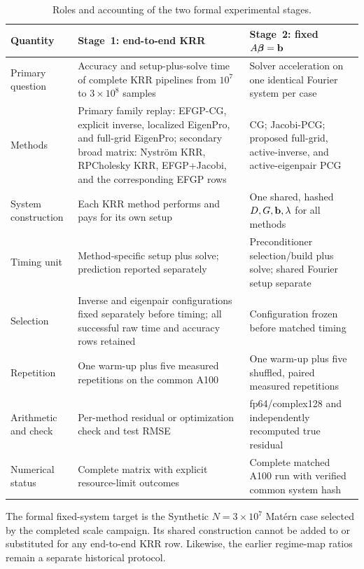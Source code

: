 \begin{table}[H]
\centering
\footnotesize
\caption{Roles and accounting of the two formal experimental stages.}
\label{tab:experiment-stage-protocols}
\begin{tabular}{@{}p{}p{}p{}@{}}
\toprule
Quantity & Stage~1: end-to-end KRR & Stage~2: fixed \(A\boldsymbol\beta=\mathbf b\) \\
\midrule
Primary question
& Accuracy and setup-plus-solve time of complete KRR pipelines from \(10^7\)
to \(3\times10^8\) samples
& Solver acceleration on one identical Fourier system per case \\
Methods
& Primary family replay: EFGP-CG, explicit inverse, localized EigenPro, and
full-grid EigenPro; secondary broad matrix: Nystr\"om KRR, RPCholesky KRR,
EFGP+Jacobi, and the corresponding EFGP rows
& CG; Jacobi-PCG; proposed full-grid, active-inverse, and active-eigenpair PCG \\
System construction
& Each KRR method performs and pays for its own setup
& One shared, hashed \(D,G,\mathbf b,\lambda\) for all methods \\
Timing unit
& Method-specific setup plus solve; prediction reported separately
& Preconditioner selection/build plus solve; shared Fourier setup separate \\
Selection
& Inverse and eigenpair configurations fixed separately before timing; all
successful raw time and accuracy rows retained
& Configuration frozen before matched timing \\
Repetition
& One warm-up plus five measured repetitions on the common A100
& One warm-up plus five shuffled, paired measured repetitions \\
Arithmetic and check
& Per-method residual or optimization check and test RMSE
& fp64/complex128 and independently recomputed true residual \\
Numerical status
& Complete matrix with explicit resource-limit outcomes
& Complete matched A100 run with verified common system hash \\
\bottomrule
\end{tabular}
\end{table}

The formal fixed-system target is the Synthetic \(N=3\times10^7\) Mat\'ern
case selected by the completed scale campaign.  Its shared construction cannot
be added to or substituted for any end-to-end KRR row.  Likewise, the earlier
regime-map ratios remain a separate historical protocol.

